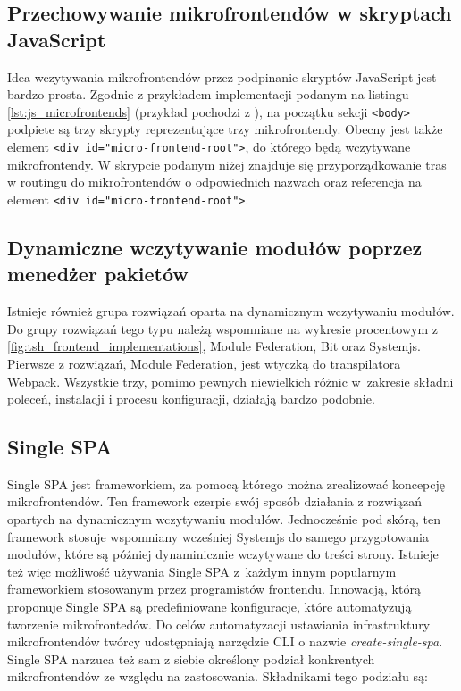 \documentclass{SGGW-thesis}
\begin{document}
\subsection{Przechowywanie mikrofrontendów w skryptach JavaScript}
Idea wczytywania mikrofrontendów przez podpinanie skryptów JavaScript jest bardzo prosta. Zgodnie z przykładem implementacji podanym na listingu \cref{lst:js_microfrontends} (przykład pochodzi z \cite{fowler_2019}), na początku sekcji \lstinline{<body>} podpiete są trzy skrypty reprezentujące trzy mikrofrontendy. Obecny jest także element \lstinline{<div id="micro-frontend-root">}, do którego będą wczytywane mikrofrontendy. W skrypcie podanym niżej znajduje się przyporządkowanie tras w routingu do mikrofrontendów o odpowiednich nazwach oraz referencja na element \lstinline{<div id="micro-frontend-root">}.



\subsection{Dynamiczne wczytywanie modułów poprzez menedżer pakietów}
Istnieje również grupa rozwiązań oparta na dynamicznym wczytywaniu modułów. Do grupy rozwiązań tego typu należą wspomniane na wykresie procentowym z  \cref{fig:tsh_frontend_implementations}, Module Federation, Bit oraz Systemjs. Pierwsze z rozwiązań, Module Federation, jest wtyczką do transpilatora Webpack. Wszystkie trzy, pomimo pewnych niewielkich różnic w~zakresie składni poleceń, instalacji i procesu konfiguracji, działają bardzo podobnie.

\subsection{Single SPA}
Single SPA jest frameworkiem, za pomocą którego można zrealizować koncepcję mikrofrontendów. Ten framework czerpie swój sposób działania z rozwiązań opartych na dynamicznym wczytywaniu modułów. Jednocześnie pod skórą, ten framework stosuje wspomniany wcześniej Systemjs do samego przygotowania modułów, które są później dynaminicznie wczytywane do treści strony. Istnieje też więc możliwość używania Single SPA z~każdym innym popularnym frameworkiem stosowanym przez programistów frontendu. Innowacją, którą proponuje Single SPA są predefiniowane konfiguracje, które automatyzują tworzenie mikrofrontedów. Do celów automatyzacji ustawiania infrastruktury mikrofrontendów twórcy udostępniają narzędzie CLI o nazwie \textit{create-single-spa}. Single SPA narzuca też sam z siebie określony podział konkrentych mikrofrontendów ze względu na zastosowania. Składnikami tego podziału są:
\end{document}
